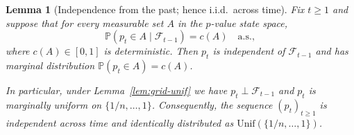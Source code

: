 \documentclass{uai2026} %
\newtheorem{lemma}{Lemma}
\newcommand{\1}{\mathbf{1}}
\newcommand{\prob}{\mathbb{P}}
\newcommand{\F}{\mathcal{F}}
\begin{document}
\begin{lemma}[Independence from the past; hence i.i.d.\ across time]
  \label{lem:iid-pvalues}
  Fix $t\ge 1$ and suppose that for every measurable set $A$ in the $p$-value state space,
  \begin{equation*}
    \prob(p_{t}\in A\mid \F_{t-1}) = c(A)\quad \text{a.s.},
  \end{equation*}
  where $c(A)\in[0,1]$ is deterministic.
  Then $p_{t}$ is independent of $\F_{t-1}$ and has marginal distribution $\prob(p_{t}\in A)=c(A)$.

  In particular, under Lemma~\ref{lem:grid-unif} we have $p_{t}\perp \F_{t-1}$ and $p_{t}$ is marginally uniform on $\{1/n,\dots,1\}$.
  Consequently, the sequence $(p_{t})_{t\ge 1}$ is independent across time and identically distributed as $\mathrm{Unif}(\{1/n,\dots,1\})$.
\end{lemma}
\end{document}
